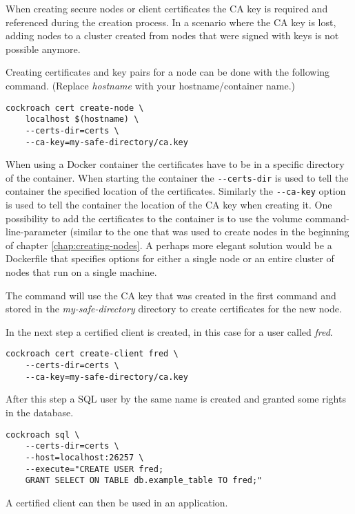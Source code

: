 When creating secure nodes or client certificates the CA key is required and referenced during the creation process.
In a scenario where the CA key is lost, adding nodes to a cluster created from nodes that were signed with keys is not possible anymore.

\medskip
Creating certificates and key pairs for a node can be done with the following command. (Replace \emph{hostname} with your hostname/container name.)

\begin{verbatim}
cockroach cert create-node \ 
    localhost $(hostname) \
    --certs-dir=certs \
    --ca-key=my-safe-directory/ca.key
\end{verbatim}

When using a Docker container the certificates have to be in a specific directory of the container.
When starting the container the \verb|--certs-dir| is used to tell the container the specified location of the certificates. Similarly the \verb|--ca-key| option is used to tell the container the location of the CA key when creating it.
One possibility to add the certificates to the container is to use the volume command-line-parameter (similar to the one that was used to create nodes in the beginning of chapter \ref{chap:creating-nodes}.
A perhaps more elegant solution would be a Dockerfile that specifies options for either a single node or an entire cluster of nodes that run on a single machine.

The command will use the CA key that was created in the first command and stored in the \emph{my-safe-directory} directory to create certificates for the new node.

\bigskip
In the next step a certified client is created, in this case for a user called \emph{fred}.

\begin{verbatim}
cockroach cert create-client fred \ 
    --certs-dir=certs \
    --ca-key=my-safe-directory/ca.key
\end{verbatim}

After this step a SQL user by the same name is created and granted some rights in the database.
\cite{cockroach-security}

\begin{verbatim}
cockroach sql \
    --certs-dir=certs \
    --host=localhost:26257 \
    --execute="CREATE USER fred;
    GRANT SELECT ON TABLE db.example_table TO fred;"
\end{verbatim}

A certified client can then be used in an application.
